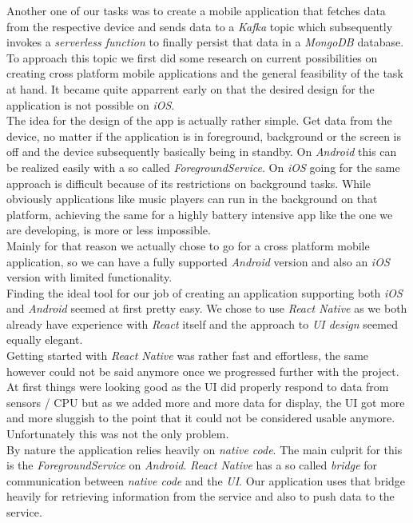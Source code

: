 \documentclass{article}
\begin{document}
  Another one of our tasks was to create a mobile application that fetches data from the respective device and sends data to a \textit{Kafka} topic which subsequently invokes a \textit{serverless function} to finally persist that data in a \textit{MongoDB} database. To approach this topic we first did some research on current possibilities on creating cross platform mobile applications and the general feasibility of the task at hand. It became quite apparrent early on that the desired design for the application is not possible on \textit{iOS}. \\
  The idea for the design of the app is actually rather simple. Get data from the device, no matter if the application is in foreground, background or the screen is off and the device subsequently basically being in standby.
  On \textit{Android} this can be realized easily with a so called \textit{ForegroundService}. On \textit{iOS} going for the same approach is difficult because of its restrictions on background tasks. While obviously applications like music players can run in the background on that platform, achieving the same for a highly battery intensive app like the one we are developing, is more or less impossible. \\
  Mainly for that reason we actually chose to go for a cross platform mobile application, so we can have a fully supported \textit{Android} version and also an \textit{iOS} version with limited functionality. \\
  Finding the ideal tool for our job of creating an application supporting both \textit{iOS} and \textit{Android} seemed at first pretty easy. We chose to use \textit{React Native} as we both already have experience with \textit{React} itself and the approach to \textit{UI design} seemed equally elegant. \\
  Getting started with \textit{React Native} was rather fast and effortless, the same however could not be said anymore once we progressed further with the project. At first things were looking good as the UI did properly respond to data from sensors / CPU but as we added more and more data for display, the UI got more and more sluggish to the point that it could not be considered usable anymore. Unfortunately this was not the only problem. \\
  By nature the application relies heavily on \textit{native code}. The main culprit for this is the \textit{ForegroundService} on \textit{Android}. \textit{React Native} has a so called \textit{bridge} for communication between \textit{native code} and the \textit{UI}. Our application uses that bridge heavily for retrieving information from the service and also to push data to the service. \\
\end{document}

